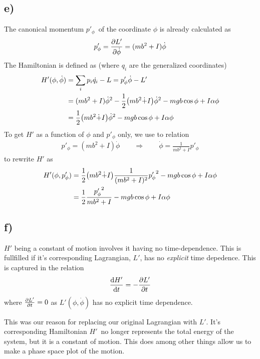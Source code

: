 \documentclass[12p,a4paper]{article}
\newcommand{\half}{\frac{1}{2}}
\begin{document}
\subsection*{e)}
The canonical momentum $p'_\phi$ of the coordinate $\phi$ is already calculated as
\begin{align*}
    p'_\phi = \pdv{L'}{\dot{\phi}} = (mb^2 + I)\dot{\phi}
\end{align*}
The Hamiltonian is defined as (where $q_i$ are the generalized coordinates)
\begin{align*}
    H'(\phi, \dot{\phi}) &= \sum_i p_i \dot{q_i} - L = p'_\phi \dot{\phi} - L' \\
    &= (mb^2 + I)\dot{\phi}^2 - \half \qty(m b^2\dot + I)\dot{\phi}^2 - mgb\cos{\phi} + I\alpha\phi \\
    &= \half \qty(m b^2\dot + I)\dot{\phi}^2 - mgb\cos{\phi} + I\alpha\phi
\end{align*}
To get $H'$ as a function of $\phi$ and $p'_\phi$ only, we use to relation
\begin{align*}
    p'_\phi = (mb^2 + I)\dot{\phi} \quad\quad \Rightarrow \quad\quad
    \dot{\phi} = \frac{1}{mb^2 + I}p'_\phi
\end{align*}
to rewrite $H'$ as
\begin{align*}
    H'(\phi, p'_\phi) &= \half \qty(m b^2\dot + I)\frac{1}{(mb^2 + I)^2}{p'_\phi}^2 - mgb\cos{\phi} + I\alpha\phi \\
    &= \half \frac{{p'_\phi}^2}{mb^2 + I} - mgb\cos{\phi} + I\alpha\phi \\
\end{align*}



\subsection*{f)}
$H'$ being a constant of motion involves it having no time-dependence. This is fullfilled if it's corresponding Lagrangian, $L'$, has no \textit{explicit} time depedence. This is captured in the relation
\[
    \dv{H'}{t} = - \pdv{L'}{t}
\]
where $\pdv{L'}{t} = 0$ as $L'(\phi, \dot{\phi})$ has no explicit time dependence.

This was our reason for replacing our original Lagrangian with $L'$. It's corresponding Hamiltonian $H'$ no longer represents the total energy of the system, but it is a constant of motion. This does among other things allow us to make a phase space plot of the motion.
\end{document}
